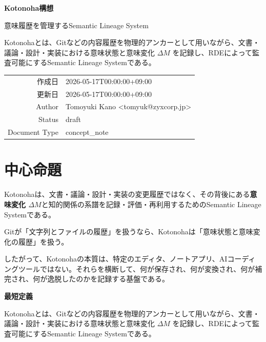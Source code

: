 \documentclass[11pt,a4paper]{ltjsarticle}
\begin{document}
\begin{titlepage}
\centering
\vspace*{20mm}
{\Huge\bfseries Kotonoha構想\par}
\vspace{4mm}
{\Large 意味履歴を管理するSemantic Lineage System\par}
\vspace{16mm}
\begin{notebox}
\centering
Kotonohaとは、Gitなどの内容履歴を物理的アンカーとして用いながら、文書・議論・設計・実装における意味状態と意味変化 $\Delta M$ を記録し、RDEによって監査可能にするSemantic Lineage Systemである。
\end{notebox}
\vfill
\begin{tabular}{rl}
作成日 & 2026-05-17T00:00:00+09:00 \\
更新日 & 2026-05-17T00:00:00+09:00 \\
Author & Tomoyuki Kano \textless tomyuk@zyxcorp.jp\textgreater \\
Status & draft \\
Document Type & concept\_note \\
\end{tabular}
\vspace*{10mm}
\end{titlepage}

\tableofcontents
\clearpage

\section{中心命題}

Kotonohaは、文書・議論・設計・実装の変更履歴ではなく、その背後にある\textbf{意味変化 $\Delta M$}と知的関係の系譜を記録・評価・再利用するためのSemantic Lineage Systemである。

Gitが「文字列とファイルの履歴」を扱うなら、Kotonohaは「意味状態と意味変化の履歴」を扱う。

したがって、Kotonohaの本質は、特定のエディタ、ノートアプリ、AIコーディングツールではない。それらを横断して、何が保存され、何が変換され、何が補完され、何が逸脱したのかを記録する基盤である。

\begin{notebox}
\textbf{最短定義}\par
Kotonohaとは、Gitなどの内容履歴を物理的アンカーとして用いながら、文書・議論・設計・実装における意味状態と意味変化 $\Delta M$ を記録し、RDEによって監査可能にするSemantic Lineage Systemである。
\end{notebox}
\end{document}
